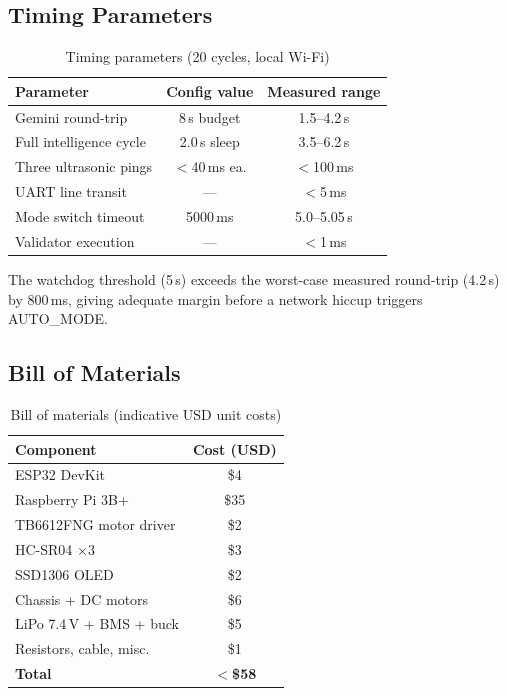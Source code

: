\documentclass[conference]{IEEEtran}
\begin{document}
\subsection{Timing Parameters}

\begin{table}[t]
\caption{Timing parameters (20 cycles, local Wi-Fi)}
\label{tab:timing}
\centering
\renewcommand{\arraystretch}{1.05}
\begin{tabular}{@{}p{3.5cm}cc@{}}
\toprule
\textbf{Parameter} & \textbf{Config value} & \textbf{Measured range} \\
\midrule
Gemini round-trip    & 8\,s budget  & 1.5--4.2\,s \\
Full intelligence cycle & 2.0\,s sleep & 3.5--6.2\,s \\
Three ultrasonic pings & $<$40\,ms ea. & $<$100\,ms \\
UART line transit    & ---          & $<$5\,ms \\
Mode switch timeout  & 5000\,ms     & 5.0--5.05\,s \\
Validator execution  & ---          & $<$1\,ms \\
\bottomrule
\end{tabular}
\end{table}

The watchdog threshold (5\,s) exceeds the worst-case measured round-trip
(4.2\,s) by 800\,ms, giving adequate margin before a network hiccup
triggers AUTO\_MODE.

\subsection{Bill of Materials}

\begin{table}[t]
\caption{Bill of materials (indicative USD unit costs)}
\label{tab:bom}
\centering
\renewcommand{\arraystretch}{1.05}
\begin{tabular}{@{}lc@{}}
\toprule
\textbf{Component} & \textbf{Cost (USD)} \\
\midrule
ESP32 DevKit              & \$4 \\
Raspberry Pi 3B+          & \$35 \\
TB6612FNG motor driver    & \$2 \\
HC-SR04 $\times$3         & \$3 \\
SSD1306 OLED              & \$2 \\
Chassis + DC motors       & \$6 \\
LiPo 7.4\,V + BMS + buck  & \$5 \\
Resistors, cable, misc.   & \$1 \\
\midrule
\textbf{Total}            & \textbf{$<$\$58} \\
\bottomrule
\end{tabular}
\end{table}
\end{document}
